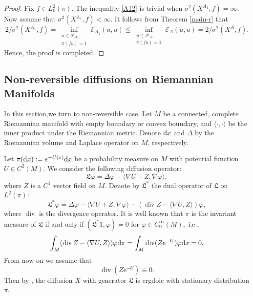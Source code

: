 \documentclass[12pt,reqno]{article}
\theoremstyle{definition}
\theoremstyle{remark}
\theoremstyle{example}
\numberwithin{equation}{section}
\newcommand{\scr}[1]{\mathscr #1}
\def\d{\mathrm{d}}
\def\e{\scr E}
\def\d{\rm d}
\def\bg{\begin}
\def\be{\bg{equation}}
\def\de{\end{equation}}
\def\lb{\label}
\def\lan{\langle}\def\ran{\rangle}
\def\d{{\mbox{\rm d}}}
\begin{document}
{\begin{proof}
Fix $f\in L^2_0(\pi)$. The inequality \eqref{A12} is trivial when $\sigma^2(X^{A_1},f)=\infty$. Now assume that $\sigma^2(X^{A_1},f)<\infty$. It follows from Theorem \ref{main-r} that
$$
2/\sigma^2(X^{A_1},f)=\inf_{\substack{u\in\scr{F}_{A_1},\\\pi(fu)=1}}\e_{A_1}(u,u)
\leq \inf_{\substack{u\in\scr{F}_{A},\\\pi(fu)=1}}\e_{A}(u,u)=2/\sigma^2(X^{A},f).
$$
Hence, the proof is completed.
\end{proof}






\subsection{Non-reversible diffusions on Riemannian Manifolds}\lb{nonrev-diff}
In this section,we turn to non-reversible case. Let $M$ be a connected, complete Riemannian manifold  with empty boundary or convex boundary, and $\lan\cdot,\cdot\ran$ be the inner product  under the Riemannian metric.
Denote  $\d x$ and $\Delta$ by the Riemannian volume and  Laplace operator on $M$, respectively.

Let $\pi(\d x):=e^{-U(x)} \d x$ be a probability measure on $M$ with potential function $U\in C^{2}(M)$.
We consider the following diffusion operator:
\be\label{Diff}
\mathfrak{L} \varphi=\Delta \varphi-\lan\nabla U-Z,\nabla \varphi\ran,
\de
where $Z$ is a $C^1$ vector field on $M$.
Denote by $\mathfrak{L}^{*}$  the dual operator of $\mathfrak{L}$ on  $L^{2}(\pi)$:
$$\mathfrak{L}^{*}\varphi=\Delta\varphi-\lan\nabla U+Z,\nabla\varphi\ran-(\operatorname{div} Z-\lan\nabla U, Z\ran)\varphi,$$
where $\operatorname{div}$ is the divergence operator.
It is well known that $\pi$ is the invariant measure of $\mathfrak{L}$ if and only if $(\mathfrak{L}^{*}1,\varphi)=0$  for $\varphi\in C_{0}^{\infty}(M),$ i.e.,
$$\int_M(\operatorname{div} Z-\lan\nabla U, Z\ran)\varphi\d \pi=\int_M\operatorname{div}( Z\mathrm{e}^{-U}) \varphi\d x=0.$$
From now on we assume that
\begin{equation}\label{A0}
\operatorname{div}( Z\mathrm{e}^{-U})\equiv 0.
\end{equation}
Then by \cite[Corollary 3.6]{brw01}, the diffusion $X$ with generator $\mathfrak{L}$ is ergdoic with stationary distribution $\pi$.


}
\end{document}
